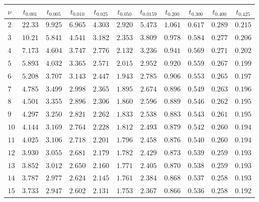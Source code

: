 
\begin{table}[htb!]
\begin{center}
{\scriptsize
\renewcommand\arraystretch{1.250000}
\begin{tabular}{p{22 pt}cccccccccc}
\hline

\rule[-2pt]{0pt}{14pt}$\nu$ & $t_{0.001}$ & $t_{0.005}$ & $t_{0.010}$ & $t_{0.025}$ & $t_{0.050}$ & $t_{0.0159}$ & $t_{0.200}$ & $t_{0.300}$ & $t_{0.400}$ & $t_{0.425}$\\
\hline
\hline
\rule[0pt]{0pt}{15pt}$2$ & $22.33$ & $9.925$ & $6.965$ & $4.303$ & $2.920$ & $5.473$ & $1.061$ & $0.617$ & $0.289$ & $0.215$\\
$3$ & $10.21$ & $5.841$ & $4.541$ & $3.182$ & $2.353$ & $3.809$ & $0.978$ & $0.584$ & $0.277$ & $0.206$\\
$4$ & $7.173$ & $4.604$ & $3.747$ & $2.776$ & $2.132$ & $3.236$ & $0.941$ & $0.569$ & $0.271$ & $0.202$\\
$5$ & $5.893$ & $4.032$ & $3.365$ & $2.571$ & $2.015$ & $2.952$ & $0.920$ & $0.559$ & $0.267$ & $0.199$\\
$6$ & $5.208$ & $3.707$ & $3.143$ & $2.447$ & $1.943$ & $2.785$ & $0.906$ & $0.553$ & $0.265$ & $0.197$\\
$7$ & $4.785$ & $3.499$ & $2.998$ & $2.365$ & $1.895$ & $2.674$ & $0.896$ & $0.549$ & $0.263$ & $0.196$\\
$8$ & $4.501$ & $3.355$ & $2.896$ & $2.306$ & $1.860$ & $2.596$ & $0.889$ & $0.546$ & $0.262$ & $0.195$\\
$9$ & $4.297$ & $3.250$ & $2.821$ & $2.262$ & $1.833$ & $2.538$ & $0.883$ & $0.543$ & $0.261$ & $0.195$\\
$10$ & $4.144$ & $3.169$ & $2.764$ & $2.228$ & $1.812$ & $2.493$ & $0.879$ & $0.542$ & $0.260$ & $0.194$\\
$11$ & $4.025$ & $3.106$ & $2.718$ & $2.201$ & $1.796$ & $2.458$ & $0.876$ & $0.540$ & $0.260$ & $0.194$\\
$12$ & $3.930$ & $3.055$ & $2.681$ & $2.179$ & $1.782$ & $2.429$ & $0.873$ & $0.539$ & $0.259$ & $0.193$\\
$13$ & $3.852$ & $3.012$ & $2.650$ & $2.160$ & $1.771$ & $2.405$ & $0.870$ & $0.538$ & $0.259$ & $0.193$\\
$14$ & $3.787$ & $2.977$ & $2.624$ & $2.145$ & $1.761$ & $2.384$ & $0.868$ & $0.537$ & $0.258$ & $0.193$\\
$15$ & $3.733$ & $2.947$ & $2.602$ & $2.131$ & $1.753$ & $2.367$ & $0.866$ & $0.536$ & $0.258$ & $0.192$\\

\end{tabular}}
\end{center}
\end{table}
